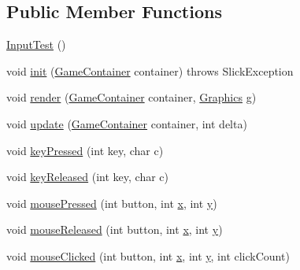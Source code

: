 \subsection*{Public Member Functions}
\begin{DoxyCompactItemize}
\item 
\mbox{\hyperlink{classorg_1_1newdawn_1_1slick_1_1tests_1_1_input_test_a73386ef79c61414f910685a079722d32}{Input\+Test}} ()
\item 
void \mbox{\hyperlink{classorg_1_1newdawn_1_1slick_1_1tests_1_1_input_test_a05e59c7c9566b28949f6362292341558}{init}} (\mbox{\hyperlink{classorg_1_1newdawn_1_1slick_1_1_game_container}{Game\+Container}} container)  throws Slick\+Exception 
\item 
void \mbox{\hyperlink{classorg_1_1newdawn_1_1slick_1_1tests_1_1_input_test_a32403d8a2b9ea3a1866d22249272850d}{render}} (\mbox{\hyperlink{classorg_1_1newdawn_1_1slick_1_1_game_container}{Game\+Container}} container, \mbox{\hyperlink{classorg_1_1newdawn_1_1slick_1_1_graphics}{Graphics}} g)
\item 
void \mbox{\hyperlink{classorg_1_1newdawn_1_1slick_1_1tests_1_1_input_test_a7a7f354765d01fa0bf20cff2c308df63}{update}} (\mbox{\hyperlink{classorg_1_1newdawn_1_1slick_1_1_game_container}{Game\+Container}} container, int delta)
\item 
void \mbox{\hyperlink{classorg_1_1newdawn_1_1slick_1_1tests_1_1_input_test_ac6d6fa874dbf27ac0517fff69a7c4eeb}{key\+Pressed}} (int key, char c)
\item 
void \mbox{\hyperlink{classorg_1_1newdawn_1_1slick_1_1tests_1_1_input_test_ae8aa9534b80812da81a5c10bfd10954c}{key\+Released}} (int key, char c)
\item 
void \mbox{\hyperlink{classorg_1_1newdawn_1_1slick_1_1tests_1_1_input_test_a171626d9985a4dac34a09ad73ec99a1e}{mouse\+Pressed}} (int button, int \mbox{\hyperlink{classorg_1_1newdawn_1_1slick_1_1tests_1_1_input_test_a95f99c94f1e661a629501a3205d78c15}{x}}, int \mbox{\hyperlink{classorg_1_1newdawn_1_1slick_1_1tests_1_1_input_test_a18ce34ad5ddc268a0420c747d5b19d05}{y}})
\item 
void \mbox{\hyperlink{classorg_1_1newdawn_1_1slick_1_1tests_1_1_input_test_a72286bb4e1e168926a47732f055eeab0}{mouse\+Released}} (int button, int \mbox{\hyperlink{classorg_1_1newdawn_1_1slick_1_1tests_1_1_input_test_a95f99c94f1e661a629501a3205d78c15}{x}}, int \mbox{\hyperlink{classorg_1_1newdawn_1_1slick_1_1tests_1_1_input_test_a18ce34ad5ddc268a0420c747d5b19d05}{y}})
\item 
void \mbox{\hyperlink{classorg_1_1newdawn_1_1slick_1_1tests_1_1_input_test_a69ff71dd569d86c9b5b187d8329078be}{mouse\+Clicked}} (int button, int \mbox{\hyperlink{classorg_1_1newdawn_1_1slick_1_1tests_1_1_input_test_a95f99c94f1e661a629501a3205d78c15}{x}}, int \mbox{\hyperlink{classorg_1_1newdawn_1_1slick_1_1tests_1_1_input_test_a18ce34ad5ddc268a0420c747d5b19d05}{y}}, int click\+Count)

\end{DoxyCompactItemize}
